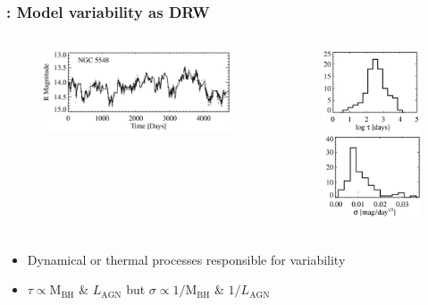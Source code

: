 \documentclass[hyperref={pdfpagelabels=false}]{beamer}
\begin{document}
\begin{frame}
\frametitle{\citet{Kelly09}: Model variability as DRW}
  \begin{columns}
    \begin{column}{0.6\textwidth}
      \begin{center}
        \begin{figure}
          \includegraphics[scale=0.4]{images/Kelly09a.jpg}
        \end{figure}
      \end{center}
    \end{column}
    \begin{column}{0.4\textwidth}
        \begin{figure}
          \includegraphics[scale=0.3]{images/Kelly09bf.jpg}
        \end{figure}
    \end{column}
  \end{columns}
  \begin{itemize}
    \item Dynamical or thermal processes responsible for variability
    \item $\tau \propto \mathrm{M}_{\mathrm{BH}}$ \& $L_{\mathrm{AGN}}$ but $\sigma \propto 1/\mathrm{M}_{\mathrm{BH}}$ \& $1/L_{\mathrm{AGN}}$
  \end{itemize}
\end{frame}
\end{document}
